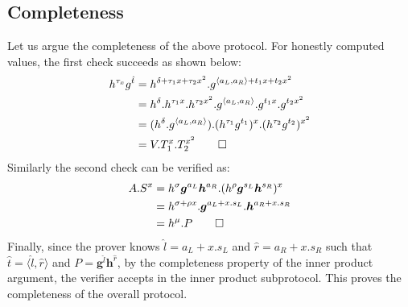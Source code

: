 \documentclass[11pt]{article}
\begin{document}
\subsection{Completeness}
Let us argue the completeness of the above protocol. For honestly computed
values, the first check succeeds as shown below:
\begin{align*}
h^{\tau_x}g^{\hat{t}} &= h^{\delta + \tau_1x + \tau_2x^2}.
                            g^{\langle a_L, a_R \rangle + t_1x + t_2x^2} \\
&= h^\delta.h^{\tau_1x}.h^{\tau_2x^2}.g^{\langle a_L, a_R \rangle}.
  g^{t_1x}.g^{t_2x^2} \\
&= (h^\delta.g^{\langle a_L, a_R
\rangle}).(h^{\tau_1}g^{t_1})^x.(h^{\tau_2}g^{t_2})^{x^2} \\
&= V.T_1^x.T_2^{x^2} \qed
\end{align*}
Similarly the second check can be verified as:
\begin{align*}
A.S^x &= h^\sigma\bm{g}^{a_L}\bm{h}^{a_R}.(h^\rho\bm{g}^{s_L}\bm{h}^{s_R})^x \\
&= h^{\sigma + \rho x}.\bm{g}^{a_L + x.s_L}.\bm{h}^{a_R + x.s_R} \\
&= h^{\mu}.P \qed
\end{align*}
Finally, since the prover knows $\hat{l}=a_L+x.s_L$ and $\hat{r}=a_R+x.s_R$
such that $\hat{t}=\langle \hat{l},\hat{r} \rangle$ and
$P=\bm{g}^{\hat{l}}\bm{h}^{\hat{r}}$, by the completeness property of the inner
product argument, the verifier accepts in the inner product subprotocol. This
proves the completeness of the overall protocol. 
\end{document}
